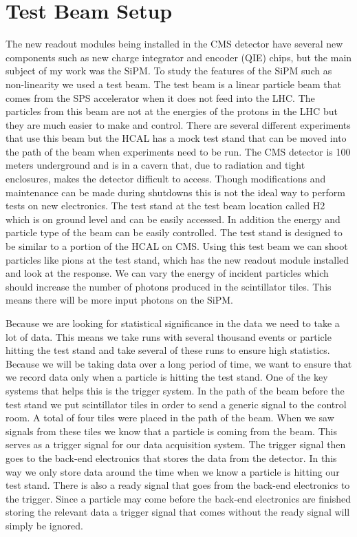 \section{Test Beam Setup}


The new readout modules being installed in the CMS detector have several new components such as new charge integrator and encoder (QIE) chips, but the main subject of my work was the SiPM. To study the features of the SiPM such as non-linearity we used a test beam. The test beam is a linear particle beam that comes from the SPS accelerator when it does not feed into the LHC. The particles from this beam are not at the energies of the protons in the LHC but they are much easier to make and control. There are several different experiments that use this beam but the HCAL has a mock test stand that can be moved into the path of the beam when experiments need to be run. The CMS detector is 100 meters underground and is in a cavern that, due to radiation and tight enclosures, makes the detector difficult to access. Though modifications and maintenance can be made during shutdowns this is not the ideal way to perform tests on new electronics. The test stand at the test beam location called H2 which is on ground level and can be easily accessed. In addition the energy and particle type of the beam can be easily controlled. The test stand is designed to be similar to a portion of the HCAL on CMS. Using this test beam we can shoot particles like pions at the test stand, which has the new readout module installed and look at the response. We can vary the energy of incident particles which should increase the number of photons produced in the scintillator tiles. This means there will be more input photons on the SiPM.


Because we are looking for statistical significance in the data we need to take a lot of data. This means we take runs with several thousand events or particle hitting the test stand and take several of these runs to ensure high statistics. Because we will be taking data over a long period of time, we want to ensure that we record data only when a particle is hitting the test stand. One of the key systems that helps this is the trigger system. In the path of the beam before the test stand we put scintillator tiles in order to send a generic signal to the control room. A total of four tiles were placed in the path of the beam. When we saw signals from these tiles we know that a particle is coming from the beam. This serves as a trigger signal for our data acquisition system. The trigger signal then goes to the back-end electronics that stores the data from the detector. In this way we only store data around the time when we know a particle is hitting our test stand. There is also a ready signal that goes from the back-end electronics to the trigger. Since a particle may come before the back-end electronics are finished storing the relevant data a trigger signal that comes without the ready signal will simply be ignored.

